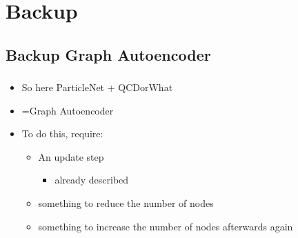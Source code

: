 \documentclass[hyperref={pdfpagelabels=false}]{beamer}
\begin{document}
\newpage
\appendix

\newpage
\section{Backup}\label{sec:Backup}



\subsection{Backup Graph Autoencoder }\label{sec:Backup Graph Autoencoder}

\begin{frame}[label=]
\frametitle{}
\begin{itemize}

    \item So here ParticleNet + QCDorWhat

    \item =Graph Autoencoder

    \item To do this, require:

\begin{itemize}

    \item An update step

\begin{itemize}

    \item already described


\end{itemize}

    \item something to reduce the number of nodes

    \item something to increase the number of nodes afterwards again


\end{itemize}

\end{itemize}
\end{frame}
\end{document}
